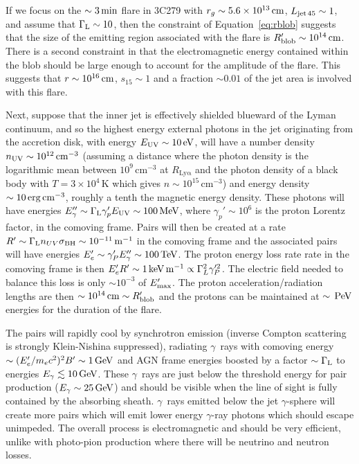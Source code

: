 \documentclass[twocolumn,linenumbers]{aastex62}
\newcommand{\Grays}{$\gamma$~rays\xspace}
\newcommand{\gray}{$\gamma$-ray\xspace}
\begin{document}
If we focus on the $\sim3\,{\rm min}$ flare in 3C279 with %
$r_g\sim5.6\times10^{13}\,{\rm cm}$, 
$L_{\rm jet\,45}\sim1$, and assume that $\Gamma_{\rm L}\sim10$, then the constraint of Equation~\ref{eq:rblob} suggests that the size of the emitting region associated with the flare is $R'_{\rm blob}\sim10^{14}\,{\rm cm}$. There is a second constraint in that the electromagnetic energy contained within the blob should be large enough to account for the amplitude of the flare. This suggests that $r\sim10^{16}\,{\rm cm}$, $s_{15}\sim1$ and a fraction $\sim0.01$ of the jet area is involved with this flare. 

Next, suppose that the inner jet is effectively shielded blueward of the Lyman continuum, and so the highest energy external photons in the jet originating from the accretion disk, with energy $E_{\rm UV}\sim10\,{\rm eV}$, will have a number density $n_{\rm UV}\sim10^{12}\,{\rm cm}^{-3}$ (assuming a distance where the photon density is the logarithmic mean between $10^9\,\mathrm{cm}^{-3}$ at $R_\mathrm{Ly\alpha}$ and the photon density of a black body with $T = 3\times10^4\,$K which gives $n\sim10^{15}\,\mathrm{cm}^{-3}$) and energy density $\sim10\,{\rm erg\,cm}^{-3}$, roughly a tenth the magnetic energy density. These photons will have energies $E_\gamma''\sim\Gamma_{\rm L}\gamma_p'E_{\rm UV}\sim100\,{\rm MeV}$, where $\gamma_p'\sim10^6$ is the proton Lorentz factor, in the comoving frame. Pairs will then be created at a rate $R'\sim\Gamma_{\rm L}n_{UV}\sigma_{\rm BH}\sim10^{-11}\,{\rm m}^{-1}$ in the comoving frame and the associated pairs will have energies $E_e'\sim \gamma_P'E_\gamma''\sim100\,{\rm TeV}$. The proton energy loss rate rate in the comoving frame is then $E_e'R'\sim1\,{\rm keV}\,{\rm m}^{-1}\propto\Gamma_L^2\gamma_P'^2$. The electric field needed to balance this loss is only $\sim10^{-3}$ of $E_{\rm max}'$. The proton acceleration/radiation lengths are then $\sim10^{14}\,{\rm cm}\sim R_{\rm blob}'$ and the protons can be maintained at $\sim\,{\rm PeV}$ energies for the duration of the flare.

The pairs will rapidly cool by synchrotron emission (inverse Compton scattering is strongly Klein-Nishina suppressed), radiating \Grays with comoving energy $\sim (E_e'/m_ec^2)^2 B' \sim 1\,{\rm GeV}$ and AGN frame energies boosted by a factor $\sim\Gamma_{\rm L}$ to energies $E_\gamma\lesssim10\,{\rm GeV}$. These \Grays are just below the threshold energy for pair production ($E_\gamma\sim25\,{\rm GeV}$) and should be visible when the line of sight is fully contained by the absorbing sheath. \Grays emitted below the jet $\gamma$-sphere will create more pairs which will emit lower energy \gray photons which should escape unimpeded. The overall process is electromagnetic and should be very efficient, unlike with photo-pion production where there will be neutrino and neutron losses. 
\end{document}
